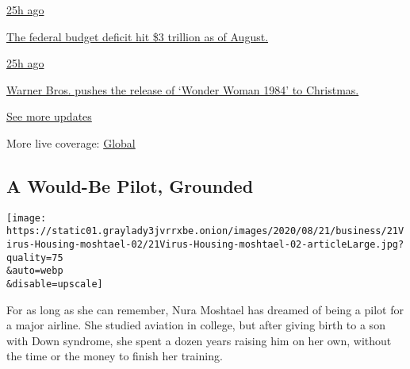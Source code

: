 \href{https://www.nytimes3xbfgragh.onion/live/2020/09/11/business/stock-market-today-coronavirus?action=click\&pgtype=Article\&state=default\&region=MAIN_CONTENT_1\&context=storylines_live_updates\#the-federal-budget-deficit-hit-3-trillion-as-of-august}{25h
ago}

\href{https://www.nytimes3xbfgragh.onion/live/2020/09/11/business/stock-market-today-coronavirus?action=click\&pgtype=Article\&state=default\&region=MAIN_CONTENT_1\&context=storylines_live_updates\#the-federal-budget-deficit-hit-3-trillion-as-of-august}{The
federal budget deficit hit \$3 trillion as of August.}

\href{https://www.nytimes3xbfgragh.onion/live/2020/09/11/business/stock-market-today-coronavirus?action=click\&pgtype=Article\&state=default\&region=MAIN_CONTENT_1\&context=storylines_live_updates\#warner-bros-pushes-the-release-of-wonder-woman-1984-to-christmas}{25h
ago}

\href{https://www.nytimes3xbfgragh.onion/live/2020/09/11/business/stock-market-today-coronavirus?action=click\&pgtype=Article\&state=default\&region=MAIN_CONTENT_1\&context=storylines_live_updates\#warner-bros-pushes-the-release-of-wonder-woman-1984-to-christmas}{Warner
Bros. pushes the release of `Wonder Woman 1984' to Christmas.}

\href{https://www.nytimes3xbfgragh.onion/live/2020/09/11/business/stock-market-today-coronavirus?action=click\&pgtype=Article\&state=default\&region=MAIN_CONTENT_1\&context=storylines_live_updates}{See
more updates}

More live coverage:
\href{https://www.nytimes3xbfgragh.onion/2020/09/11/world/covid-19-coronavirus.html?action=click\&pgtype=Article\&state=default\&region=MAIN_CONTENT_1\&context=storylines_live_updates}{Global}

\hypertarget{a-would-be-pilot-grounded}{%
\subsection{A Would-Be Pilot,
Grounded}\label{a-would-be-pilot-grounded}}

\texttt{[image: https://static01.graylady3jvrrxbe.onion/images/2020/08/21/business/21Virus-Housing-moshtael-02/21Virus-Housing-moshtael-02-articleLarge.jpg?quality=75\\\&auto=webp\\\&disable=upscale]}

For as long as she can remember, Nura Moshtael has dreamed of being a
pilot for a major airline. She studied aviation in college, but after
giving birth to a son with Down syndrome, she spent a dozen years
raising him on her own, without the time or the money to finish her
training.

